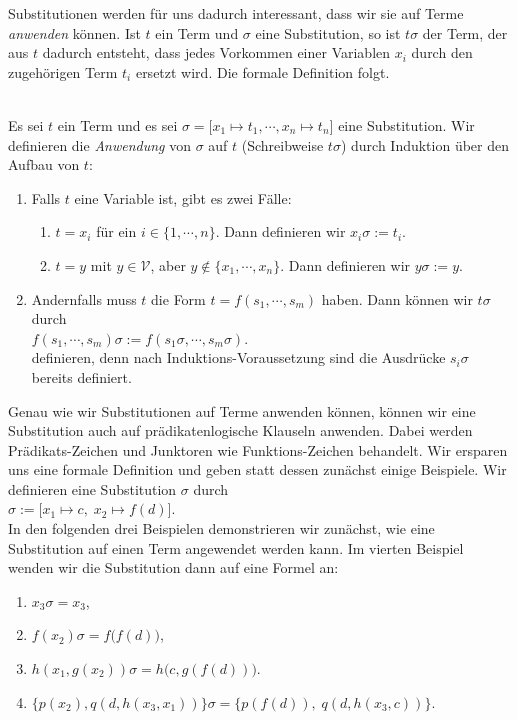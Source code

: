 \noindent
Substitutionen werden f\"{u}r uns dadurch interessant, dass wir sie auf Terme \emph{anwenden}
k\"{o}nnen.  Ist $t$ ein Term und  
$\sigma$ eine Substitution, so ist $t\sigma$ der Term, der aus $t$ dadurch entsteht, dass jedes Vorkommen einer Variablen
$x_i$ durch den zugeh\"{o}rigen Term $t_i$ ersetzt wird.  Die formale Definition folgt. 
\begin{Definition}
\hspace*{\fill} \\
Es sei $t$ ein Term und es sei $\sigma = \bigl[ x_1 \mapsto t_1, \cdots, x_n \mapsto t_n \bigr]$
eine Substitution. Wir definieren die \emph{Anwendung} von $\sigma$ auf $t$ (Schreibweise $t\sigma$) durch Induktion \"{u}ber
den Aufbau von $t$: 
\begin{enumerate}
\item Falls $t$ eine Variable ist, gibt es zwei F\"{a}lle:
  \begin{enumerate}
  \item $t = x_i$ f\"{u}r ein $i\in\{1,\cdots,n\}$.  Dann definieren wir \quad  $x_i\sigma := t_i$.
  \item $t = y$ mit $y\in\mathcal{V}$, aber $y \not\in \{x_1,\cdots,x_n\}$. Dann definieren wir \quad $y\sigma := y$.
  \end{enumerate}
\item Andernfalls muss $t$ die Form $t= f(s_1,\cdots,s_m)$ haben. Dann k\"{o}nnen wir $t\sigma$ durch \\[0.2cm]
      \hspace*{1.3cm} $f(s_1, \cdots, s_m)\sigma := f(s_1\sigma, \cdots, s_m\sigma)$. \\[0.2cm]
      definieren, denn nach Induktions-Voraussetzung sind die Ausdr\"{u}cke $s_i\sigma$ bereits definiert.      
      \eox
\end{enumerate}
\end{Definition}

Genau wie wir Substitutionen auf Terme anwenden k\"{o}nnen, k\"{o}nnen wir eine Substitution
auch auf pr\"{a}dikatenlogische Klauseln anwenden.  Dabei werden Pr\"{a}dikats-Zeichen und
Junktoren wie Funktions-Zeichen behandelt.
Wir ersparen uns eine formale Definition und geben statt dessen zun\"{a}chst einige Beispiele. 
Wir definieren eine Substitution $\sigma$ durch \\[0.2cm]
\hspace*{1.3cm} $\sigma := \big[ x_1 \mapsto c,\; x_2 \mapsto f(d) \big]$. \\[0.2cm]
In den folgenden drei Beispielen demonstrieren wir zun\"{a}chst, wie eine Substitution
auf einen Term angewendet werden kann.  Im vierten Beispiel wenden wir die Substitution
dann auf eine Formel an:
\begin{enumerate}
\item $x_3\sigma = x_3$,
\item $f(x_2)\sigma = f\bigl(f(d)\bigr)$,
\item $h(x_1,g(x_2))\sigma = h\bigl(c,g(f(d))\bigr)$.
\item $\bigl\{ p(x_2), q(d,h(x_3,x_1))\bigr\}\sigma = \bigl\{ p(f(d)),\; q(d,h(x_3,c))\bigr\}$.
\end{enumerate}


